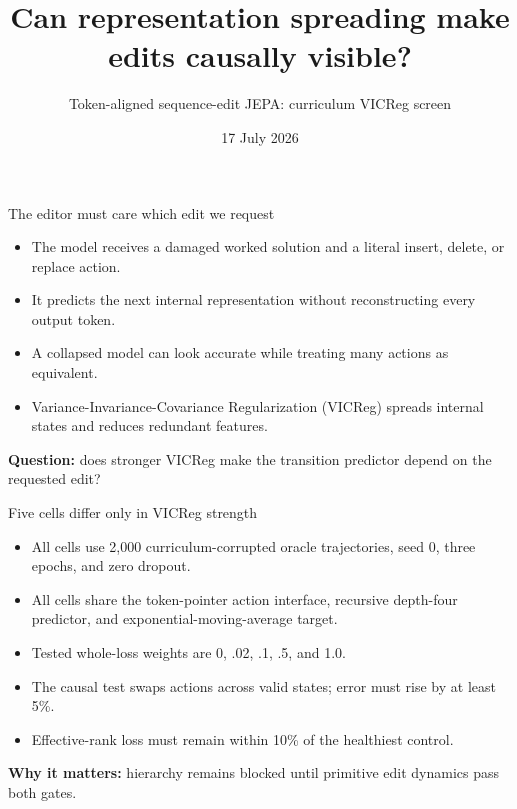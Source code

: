 \documentclass[aspectratio=169]{beamer}
\title{Can representation spreading make edits causally visible?}
\subtitle{Token-aligned sequence-edit JEPA: curriculum VICReg screen}
\date{17 July 2026}
\begin{document}
\frame{\titlepage}

\begin{frame}{The editor must care which edit we request}
  \begin{itemize}
    \item The model receives a damaged worked solution and a literal insert, delete, or replace action.
    \item It predicts the next internal representation without reconstructing every output token.
    \item A collapsed model can look accurate while treating many actions as equivalent.
    \item Variance-Invariance-Covariance Regularization (VICReg) spreads internal states and reduces redundant features.
  \end{itemize}
  \vfill
  \textbf{Question:} does stronger VICReg make the transition predictor depend on the requested edit?
\end{frame}

\begin{frame}{Five cells differ only in VICReg strength}
  \begin{itemize}
    \item All cells use 2,000 curriculum-corrupted oracle trajectories, seed 0, three epochs, and zero dropout.
    \item All cells share the token-pointer action interface, recursive depth-four predictor, and exponential-moving-average target.
    \item Tested whole-loss weights are 0, .02, .1, .5, and 1.0.
    \item The causal test swaps actions across valid states; error must rise by at least 5\%.
    \item Effective-rank loss must remain within 10\% of the healthiest control.
  \end{itemize}
  \vfill
  \textbf{Why it matters:} hierarchy remains blocked until primitive edit dynamics pass both gates.
\end{frame}
\end{document}

